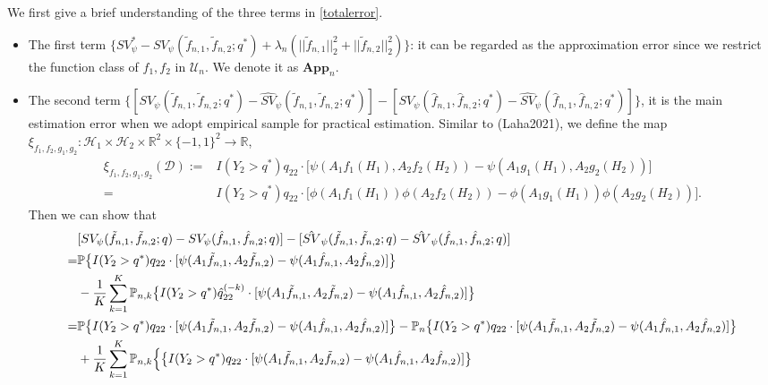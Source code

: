 \documentclass[10pt]{article}
\theoremstyle{remark} \newtheorem{rem}{Remark}
\begin{document}
We first give a brief understanding of the three terms in \eqref{totalerror}.
\begin{itemize}
    \item The first term $\Big\{SV_\psi^* - SV_\psi(\tilde f_{n,1},\tilde f_{n,2};q^*) + \lambda_n(||\tilde f_{n,1}||_{2}^2+||\tilde f_{n,2}||_{2}^2) \Big\}$: it can be regarded as the approximation error since we restrict the function class of $f_1,f_2$ in $\mathcal{U}_n$. We denote it as $\textbf{App}_n$.
    
    \item The second term $\Big\{[SV_\psi(\tilde f_{n,1},\tilde f_{n,2};q^*) - \hat{SV}_\psi(\tilde f_{n,1},\tilde f_{n,2};q^*)] - [SV_\psi(\hat f_{n,1},\hat f_{n,2};q^*) - \hat{SV}_\psi(\hat f_{n,1},\hat f_{n,2};q^*)]\Big\}$, it is the main estimation error when we adopt empirical sample for practical estimation. 
    Similar to (Laha2021), we define the map 
    $\xi_{f_1,f_2,g_1,g_2}:\mathcal{H}_1\times\mathcal{H}_2\times\mathbb{R}^2\times\{-1,1\}^2 \to \mathbb{R}$,
    \begin{align*}
        \xi_{f_1,f_2,g_1,g_2}(\mathcal{D}):=& I(Y_2 > q^*) q_{22}\cdot \big[ \psi(A_1f_1(H_1),A_2f_2(H_2))- \psi(A_1g_1(H_1),A_2g_2(H_2))\big] \\
        =& I(Y_2 > q^*) q_{22} \cdot \big[ \phi(A_1f_1(H_1))\phi(A_2f_2(H_2))- \phi(A_1g_1(H_1))\phi(A_2g_2(H_2))\big].
    \end{align*}
    Then we can show that 
        \begin{align}
            & [SV_\psi(\tilde f_{n,1},\tilde f_{n,2};q) - SV_\psi(\hat f_{n,1},\hat f_{n,2};q)]-[\hat{SV}_\psi(\tilde f_{n,1},\tilde f_{n,2};q) -\hat{SV}_\psi(\hat f_{n,1},\hat f_{n,2};q)] \notag\\
            =& \mathbb{P}\big\{I(Y_2>q^*) q_{22}\cdot[\psi(A_1\tilde f_{n,1},A_2 \tilde f_{n,2}) - \psi(A_1\hat f_{n,1},A_2 \hat f_{n,2})]\big\} \notag\\
            &- \frac{1}{K} \sum_{k=1}^K \mathbb{P}_{n,k} \big\{I(Y_2>q^*) \hat q_{22}^{(-k)} \cdot [\psi(A_1\tilde f_{n,1},A_2 \tilde f_{n,2})  - \psi(A_1\hat f_{n,1},A_2 \hat f_{n,2})]\big\} \notag\\
            =& \mathbb{P}\big\{I(Y_2>q^*)q_{22}\cdot[\psi(A_1\tilde f_{n,1},A_2 \tilde f_{n,2}) - \psi(A_1\hat f_{n,1},A_2 \hat f_{n,2})]\big\} - \mathbb{P}_n\big\{I(Y_2>q^*)q_{22}\cdot[\psi(A_1\tilde f_{n,1},A_2 \tilde f_{n,2}) - \psi(A_1\hat f_{n,1},A_2 \hat f_{n,2})]\big\} \notag\\
            &+ \frac{1}{K} \sum_{k=1}^K \mathbb{P}_{n,k}\Big\{ \big\{I(Y_2>q^*)q_{22}\cdot[\psi(A_1\tilde f_{n,1},A_2 \tilde f_{n,2}) - \psi(A_1\hat f_{n,1},A_2 \hat f_{n,2})]\big\}\notag\\

\end{align}
\end{itemize}
\end{document}
